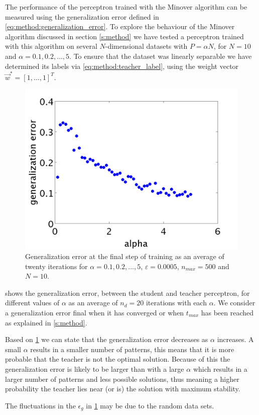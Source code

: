 The performance of the perceptron trained with the Minover algorithm can be measured using the generalization error defined in \autoref{eq:method:generalization_error}. To explore the behaviour of the Minover algorithm discussed in section \ref{s:method} we have tested a perceptron trained with this algorithm on several $N$-dimensional datasets with $P = \alpha N$, for $N = 10$ and $\alpha = 0.1, 0.2, \dotsc, 5$. To ensure that the dataset was linearly separable we have determined its labels via \eqref{eq:method:teacher_label}, using the weight vector $\vec{w}^* = [1, \dotsc, 1]^T$.\\

\begin{figure}[b]
	\centering
	\includegraphics[width=0.9\columnwidth]{./img/finalgeneralizationerrors}
	\caption{Generalization error at the final step of training as an average of twenty iterations for $\alpha = 0.1, 0.2, \dotsc, 5$, $\varepsilon = 0.0005$, $n_{max} = 500$ and $N = 10$.}
	\label{fig:exp:finalgeneralizationError}
\end{figure}

 shows the generalization error, between the student and teacher perceptron, for different values of $\alpha$ as an average of $n_d = 20$ iterations with each $\alpha$. We consider a generalization error final when it has converged or when $t_{max}$ has been reached as explained in \cref{s:method}. 

Based on \cref{fig:exp:finalgeneralizationError} we can state that the generalization error decreases as $\alpha$ increases. A small $\alpha$ results in a smaller number of patterns, this means that it is more probable that the teacher is not the optimal solution. Because of this the generalization error is likely to be larger than with a large $\alpha$ which results in a larger number of patterns and less possible solutions, thus meaning a higher probability the teacher lies near (or is) the solution with maximum stability.

The fluctuations in the $\epsilon_g$ in \cref{fig:exp:finalgeneralizationError} may be due to the random data sets.\\
